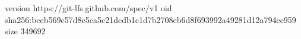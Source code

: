 version https://git-lfs.github.com/spec/v1
oid sha256:bceb569c57d8e5ca5c21dcdb1c1d7b2708eb6d8f693992a49281d12a794ec959
size 349692
